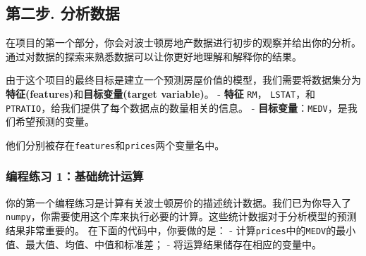 \documentclass[11pt]{article}
\begin{document}
\subsection{第二步.
分析数据}\label{ux7b2cux4e8cux6b65.-ux5206ux6790ux6570ux636e}

在项目的第一个部分，你会对波士顿房地产数据进行初步的观察并给出你的分析。通过对数据的探索来熟悉数据可以让你更好地理解和解释你的结果。

由于这个项目的最终目标是建立一个预测房屋价值的模型，我们需要将数据集分为\textbf{特征(features)}和\textbf{目标变量(target
variable)}。 - \textbf{特征}
\texttt{\textquotesingle{}RM\textquotesingle{}}，
\texttt{\textquotesingle{}LSTAT\textquotesingle{}}，和
\texttt{\textquotesingle{}PTRATIO\textquotesingle{}}，给我们提供了每个数据点的数量相关的信息。
-
\textbf{目标变量}：\texttt{\textquotesingle{}MEDV\textquotesingle{}}，是我们希望预测的变量。

他们分别被存在\texttt{features}和\texttt{prices}两个变量名中。

    \subsubsection{编程练习
1：基础统计运算}\label{ux7f16ux7a0bux7ec3ux4e60-1ux57faux7840ux7edfux8ba1ux8fd0ux7b97}

你的第一个编程练习是计算有关波士顿房价的描述统计数据。我们已为你导入了\texttt{numpy}，你需要使用这个库来执行必要的计算。这些统计数据对于分析模型的预测结果非常重要的。
在下面的代码中，你要做的是： -
计算\texttt{prices}中的\texttt{\textquotesingle{}MEDV\textquotesingle{}}的最小值、最大值、均值、中值和标准差；
- 将运算结果储存在相应的变量中。
\end{document}

